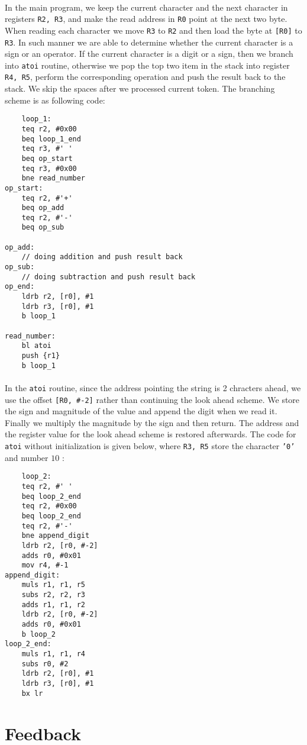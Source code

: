 \paragraph{}
In the main program, we keep the current character and the next character in registers \texttt{R2, R3}, and make the read address in \texttt{R0} point at the next two byte. When reading each character we move \texttt{R3} to \texttt{R2} and then load the byte at \texttt{[R0]} to \texttt{R3}. In such manner we are able to determine whether the current character is a sign or an operator. If the current character is a digit or a sign, then we branch into \texttt{atoi} routine, otherwise we pop the top two item in the stack into register \texttt{R4, R5}, perform the corresponding operation and push the result back to the stack. We skip the spaces after we processed current token. The branching scheme is as following code:
\begin{lstlisting}
    loop_1:
    teq r2, #0x00
    beq loop_1_end
    teq r3, #' '
    beq op_start
    teq r3, #0x00
    bne read_number
op_start:
    teq r2, #'+'
    beq op_add
    teq r2, #'-'
    beq op_sub

op_add:
    // doing addition and push result back
op_sub:
    // doing subtraction and push result back
op_end:
    ldrb r2, [r0], #1
    ldrb r3, [r0], #1
    b loop_1

read_number:
    bl atoi
    push {r1}
    b loop_1
\end{lstlisting}

\paragraph{}
In the \texttt{atoi} routine, since the address pointing the string is 2 chracters ahead, we use the offset \texttt{[R0, \#-2]} rather than continuing the look ahead scheme. We store the sign and magnitude of the value and append the digit when we read it. Finally we multiply the magnitude by the sign and then return. The address and the register value for the look ahead scheme is restored afterwards. The code for \texttt{atoi} without initialization is given below, where \texttt{R3, R5} store the character \texttt{'0'} and number $10$ :
\begin{lstlisting}
    loop_2:
    teq r2, #' '
    beq loop_2_end
    teq r2, #0x00
    beq loop_2_end
    teq r2, #'-'
    bne append_digit
    ldrb r2, [r0, #-2]
    adds r0, #0x01
    mov r4, #-1
append_digit:
    muls r1, r1, r5
    subs r2, r2, r3
    adds r1, r1, r2
    ldrb r2, [r0, #-2]
    adds r0, #0x01
    b loop_2
loop_2_end:
    muls r1, r1, r4
    subs r0, #2
    ldrb r2, [r0], #1
    ldrb r3, [r0], #1
    bx lr
\end{lstlisting}
\section{Feedback}
\paragraph{}
